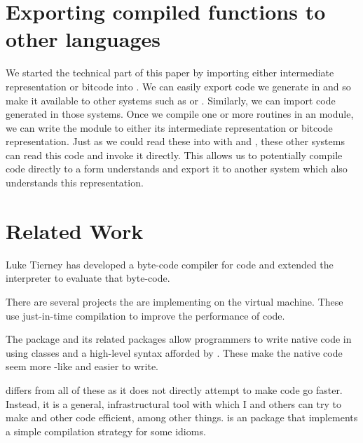 \documentclass[article]{jss}
\def\Rllvm{\Rpkg{Rllvm}}
\def\IR{intermediate representation}
\begin{document}
\section[Exporting compiled R functions to other languages]{Exporting compiled \R{} functions to other languages}

We started the technical part of this paper by importing either \IR{}
or bitcode into \R.  We can easily
export \llvm{} code we generate in \R{} and so make it available to other
systems such as \Python{} or \Matlab. Similarly, we can import \llvm{}
code generated in those systems. Once we compile one or more routines
in an \llvm{} module, we can write the module to either its \IR{} or
bitcode representation.  Just as we could read these into \R{} with
 and , these other systems can read
this code and invoke it directly.  This allows us to potentially
compile \R{} code directly to a form \llvm{} understands and export it
to another system which also understands this \llvm{} representation.


\section{Related Work}
Luke Tierney has developed a byte-code compiler for \R{} code
and extended the \R{} interpreter to evaluate that byte-code.

There are several projects the are implementing \R{} on the \Java{}
virtual machine.  These use just-in-time compilation to improve the
performance of code.

The  package and its related packages allow \R{}
programmers to write native code in \Cpp{} using classes and a
high-level syntax afforded by \Cpp{}.  These make the native code seem
more \R{}-like and easier to write.

\Rllvm{} differs from all of these as it does not directly attempt to
make \R{} code go faster. Instead, it is a general, infrastructural
tool with which I and others can try to make \R{} and other code
efficient, among other things.  is an \R{} package
that implements a simple compilation strategy for some \R{} idioms.
\end{document}
